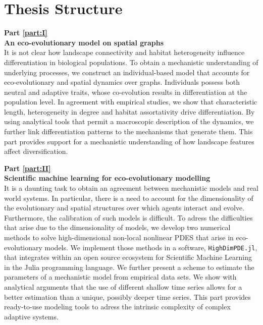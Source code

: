 \section{Thesis Structure}
\label{sec:intro:structure}

\textbf{Part \ref{part:I}\\
An eco-evolutionary model on spatial graphs} \\[0.2em]
It is not clear how landscape connectivity and habitat heterogeneity influence differentiation in biological populations. 
%
To obtain a mechanistic understanding of underlying processes, we construct an individual-based model that accounts for eco-evolutionary and spatial dynamics over graphs. 
%
Individuals possess both neutral and adaptive traits, whose co-evolution results in differentiation at the population level.
%
In agreement with empirical studies, we show that characteristic length, heterogeneity in degree and habitat assortativity drive differentiation.
%
By using analytical tools that permit a macroscopic description of the dynamics, we further link differentiation patterns to the mechanisms that generate them.
%
This part provides support for a mechanistic understanding of how landscape features affect diversification.

\textbf{Part \ref{part:II}\\
Scientific machine learning for eco-evolutionary modelling} \\[0.2em]
%
It is a daunting task to obtain an agreement between mechanistic models and real world systems. In particular, there is a need to account for the dimensionality of the evolutionary and spatial structures over which agents interact and evolve. Furthermore, the calibration of such models is difficult.
%
To adress the difficulties that arise due to the dimensionality of models, we develop two numerical methods to solve high-dimensional non-local nonlinear PDES that arise in eco-evolutionary models. We implement those methods in a software, \texttt{HighDimPDE.jl}, that integrates within an open source ecosystem for Scientific Machine Learning in the Julia programming language.
%
We further present a scheme to estimate the parameters of a mechanistic model from empirical data sets. We show with analytical arguments that the use of different shallow time series allows for a better estimation than a unique, possibly deeper time series.
%
This part provides ready-to-use modeling tools to adress the intrinsic complexity of complex adaptive systems.

